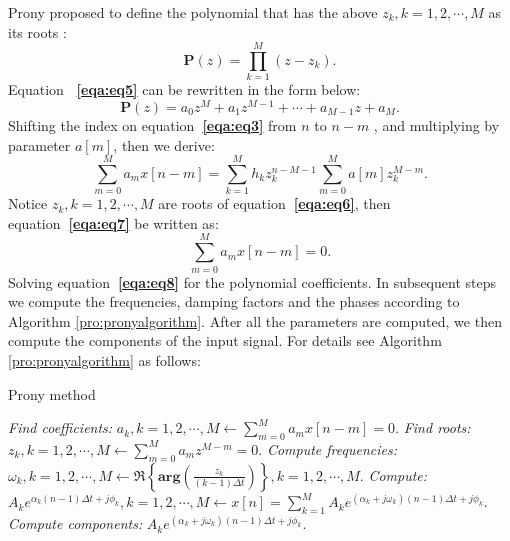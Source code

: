 Prony proposed to define the polynomial that has the 
above $z_k, k=1,2, \cdots , M$ as its roots \cite[]{prony}:
\begin{equation}
    \label{eqa:eq5}
    \mathbf{P}(z)  = \prod_{k=1}^{M}(z-z_k).
\end{equation}
Equation \textbf{~\ref{eqa:eq5}} can be rewritten in the form below:
\begin{equation}
    \label{eqa:eq6}
    \mathbf{P}(z) = a_0 z^M + a_1 z^{M-1} + \cdots + a_{M-1}z + a_M.
\end{equation}
Shifting the index on equation\textbf{~\ref{eqa:eq3}} from $n$ to $n-m$
, and multiplying by parameter $a[m]$, then we derive:
\begin{equation}
    \label{eqa:eq7}
    \sum_{m=0}^{M}a_mx[n-m] = \sum_{k=1}^{M}h_kz_k^{n-M-1}
    \sum_{m=0}^M a[m]z_{k}^{M-m}.
\end{equation}
Notice $z_k, k=1,2,\cdots, M$ are roots of equation\textbf{~\ref{eqa:eq6}},
then equation\textbf{~\ref{eqa:eq7}} be written as:
\begin{equation}
    \label{eqa:eq8}
    \sum_{m=0}^{M}a_mx[n-m] = 0.
\end{equation}
Solving equation\textbf{~\ref{eqa:eq8}} for the polynomial coefficients.
In subsequent steps we compute the frequencies, damping factors 
and the phases according to Algorithm \ref{pro:pronyalgorithm}. 
After all the parameters are computed, we then
compute the components of the input signal. For details see 
Algorithm \ref{pro:pronyalgorithm} as follows:
\begin{algorithm}
    \caption{Prony method} 
    \label{pro:pronyalgorithm}
  \begin{algorithmic}[1]
      \State \textit{Find coefficients:} $\displaystyle a_k,k=1,2,\cdots,M \gets \sum_{m=0}^{M}a_mx[n-m] = 0.$
      \State \textit{Find roots:} $\displaystyle z_k,k=1,2,\cdots,M \gets \sum_{m=0}^{M}a_mz^{M-m}= 0.$
      \State \textit{Compute frequencies:} $\displaystyle
      \omega_k, k=1,2,\cdots,M \gets \Re\left\{\mathbf{arg}\left(\frac{z_k}{(k-1)\Delta t}\right)\right\}, k=1,2,\cdots,M.$
      \State \textit{Compute:} $\displaystyle
      A_k e^{\alpha_k (n-1)\Delta t + j\phi_k}, k=1,2,\cdots,M \gets 
      x[n] = \sum_{k=1}^{M}A_k e^{(\alpha_k + j\omega_k)(n-1)\Delta t + j\phi_k}.$
      \State \textit{Compute components:} $\displaystyle
      A_k e^{(\alpha_k + j\omega_k)(n-1)\Delta t + j\phi_k}.$
  \end{algorithmic}
\end{algorithm}

